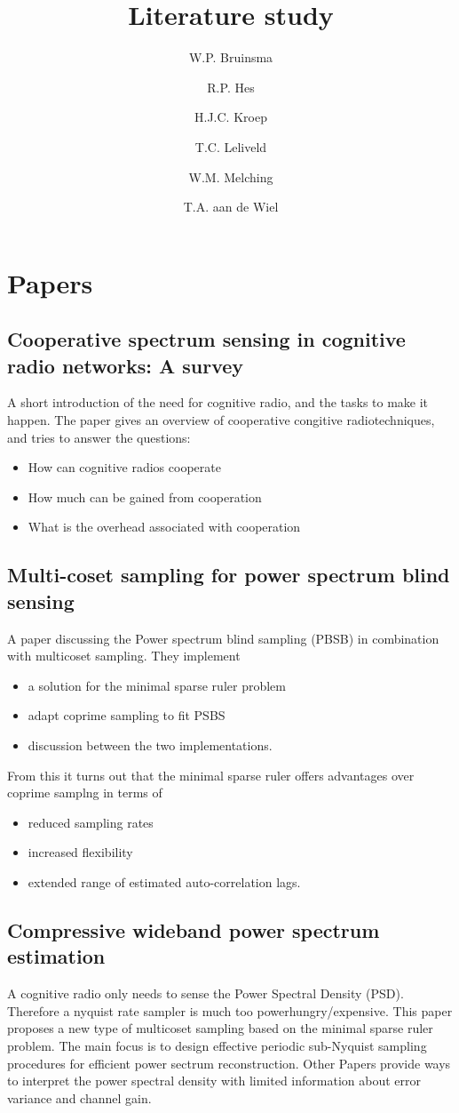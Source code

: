 \documentclass[report, oneside, a4paper, openany]{memoir}
\title{Literature study}
\author{W.P. Bruinsma \and R.P. Hes \and H.J.C. Kroep \and T.C. Leliveld \and W.M. Melching \and T.A. aan de Wiel}
\begin{document}
\chapter{Papers}
\section{Cooperative spectrum sensing in cognitive radio networks: A survey \cite{akyildiz2011cooperative}}
%
A short introduction of the need for cognitive radio, and the tasks to make it happen.
The paper gives an overview of cooperative congitive radiotechniques, and tries to answer the questions:

\begin{itemize}
\item How can cognitive radios cooperate 
\item How much can be gained from cooperation 
\item What is the overhead associated with cooperation
\end{itemize}

\section{Multi-coset sampling for power spectrum blind sensing \cite{ariananda2011multicoset}}

A paper discussing the Power spectrum blind sampling (PBSB) in combination with multicoset sampling. They implement
\begin{itemize}
    \item a solution for the minimal sparse ruler problem
    \item adapt coprime sampling to fit PSBS
    \item discussion between the two implementations.
\end{itemize}
From this it turns out that the minimal sparse ruler offers advantages over coprime samplng in terms of
\begin{itemize}
    \item reduced sampling rates
    \item increased flexibility
    \item extended range of estimated auto-correlation lags.
\end{itemize}
\section{Compressive wideband power spectrum estimation \cite{ariananda2012compressive}}
%
A cognitive radio only needs to sense the Power Spectral Density (PSD). Therefore a nyquist rate sampler is much too powerhungry/expensive. This paper proposes a new type of multicoset sampling based on the minimal sparse ruler problem. The main focus is to design effective periodic sub-Nyquist sampling procedures for efficient power sectrum reconstruction. Other Papers provide ways to interpret the power spectral density with limited information about error variance and channel gain.
\end{document}
